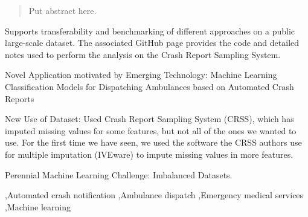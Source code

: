 \documentclass[fleqn]{cas-sc}
\begin{document}






\begin{abstract}
Put abstract here.
\vskip 1in

\end{abstract}


\begin{highlights}
	\item  Supports transferability and benchmarking of different approaches on a public large-scale dataset.  The associated GitHub page provides the code and detailed notes used to perform the analysis on the Crash Report Sampling System.  
	\item Novel Application motivated by Emerging Technology:  Machine Learning Classification Models for Dispatching Ambulances based on Automated Crash Reports
	\item New Use of Dataset:  Used Crash Report Sampling System (CRSS), which has imputed missing values for some features, but not all of the ones we wanted to use.  For the first time we have seen, we used the software the CRSS authors use for multiple imputation (IVEware) to impute missing values in more features.  
	\item Perennial Machine Learning Challenge:  Imbalanced Datasets.
\end{highlights}

\begin{keywords}
 \sep Automated crash notification \sep Ambulance dispatch \sep Emergency medical services  \sep Machine learning
\end{keywords}
\end{document}
